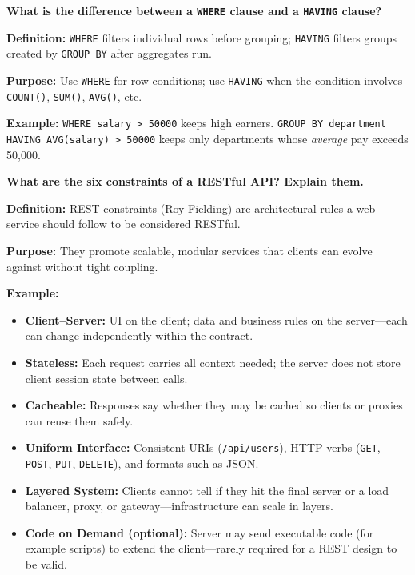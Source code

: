 \question[0]
\textbf{What is the difference between a \texttt{WHERE} clause and a \texttt{HAVING} clause?}

\textbf{Definition:} \texttt{WHERE} filters individual rows before grouping; \texttt{HAVING} filters groups created by \texttt{GROUP BY} after aggregates run.

\textbf{Purpose:} Use \texttt{WHERE} for row conditions; use \texttt{HAVING} when the condition involves \texttt{COUNT()}, \texttt{SUM()}, \texttt{AVG()}, etc.

\textbf{Example:} \texttt{WHERE salary > 50000} keeps high earners. \texttt{GROUP BY department HAVING AVG(salary) > 50000} keeps only departments whose \emph{average} pay exceeds 50,000.

\newpage


\question[0]
\textbf{What are the six constraints of a RESTful API? Explain them.}

\textbf{Definition:} REST constraints (Roy Fielding) are architectural rules a web service should follow to be considered RESTful.

\textbf{Purpose:} They promote scalable, modular services that clients can evolve against without tight coupling.

\textbf{Example:}
\begin{itemize}
  \item \textbf{Client--Server:} UI on the client; data and business rules on the server---each can change independently within the contract.
  \item \textbf{Stateless:} Each request carries all context needed; the server does not store client session state between calls.
  \item \textbf{Cacheable:} Responses say whether they may be cached so clients or proxies can reuse them safely.
  \item \textbf{Uniform Interface:} Consistent URIs (\texttt{/api/users}), HTTP verbs (\texttt{GET}, \texttt{POST}, \texttt{PUT}, \texttt{DELETE}), and formats such as JSON.
  \item \textbf{Layered System:} Clients cannot tell if they hit the final server or a load balancer, proxy, or gateway---infrastructure can scale in layers.
  \item \textbf{Code on Demand (optional):} Server may send executable code (for example scripts) to extend the client---rarely required for a REST design to be valid.
\end{itemize}

